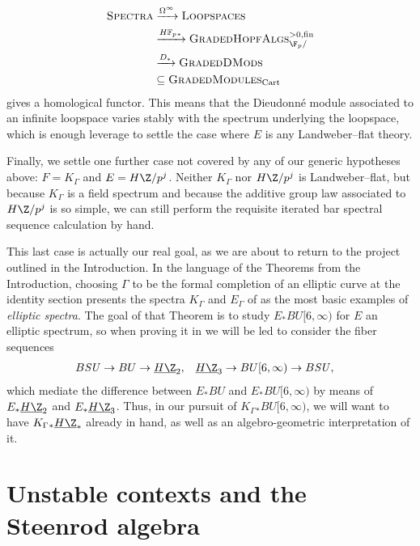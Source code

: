 \begin{description}
\begin{align*}
\CatOf{Spectra} & \xrightarrow{\Loops^\infty} \CatOf{Loopspaces} \\
& \xrightarrow{\HFp_*} \CatOf{GradedHopfAlgs}^{>0, \fin}_{\F_p/} \\
& \xrightarrow{D_*} \CatOf{GradedDMods} \\
& \subseteq \CatOf{GradedModules}_{\Cart}
\end{align*}
gives a homological functor.  This means that the Dieudonn\'e module associated to an infinite loopspace varies stably with the spectrum underlying the loopspace, which is enough leverage to settle the case where \(E\) is any Landweber--flat theory.
\item[{\Cref{CoopnsForMoravaKandHA}}] Finally, we settle one further case not covered by any of our generic hypotheses above: \(F = K_\Gamma\) and \(E = H\Z/p^j\).  Neither \(K_\Gamma\) nor \(H\Z/p^j\) is Landweber--flat, but because \(K_\Gamma\) is a field spectrum and because the additive group law associated to \(H\Z/p^j\) is so simple, we can still perform the requisite iterated bar spectral sequence calculation by hand.
\end{description}

This last case is actually our real goal, as we are about to return to the project outlined in the Introduction.  In the language of the Theorems from the Introduction, choosing \(\Gamma\) to be the formal completion of an elliptic curve at the identity section presents the spectra \(K_\Gamma\) and \(E_\Gamma\) of  as the most basic examples of \textit{elliptic spectra}.  The goal of that Theorem is to study \(E_* BU[6, \infty)\) for \(E\) an elliptic spectrum, so when proving it in  we will be led to consider the fiber sequences
\begin{align*}
B\SU \to BU & \to \OS{H\Z}{2}, & \OS{H\Z}{3} \to BU[6, \infty) & \to B\SU,
\end{align*}
which mediate the difference between \(E_* BU\) and \(E_* BU[6, \infty)\) by means of \(E_* \OS{H\Z}{2}\) and \(E_* \OS{H\Z}{3}\).  Thus, in our pursuit of \(K_\Gamma{}_* BU[6, \infty)\), we will want to have \(K_\Gamma{}_* \OS{H\Z}{*}\) already in hand, as well as an algebro-geometric interpretation of it.









\section{Unstable contexts and the Steenrod algebra}\label{UnstableContextsSection}

